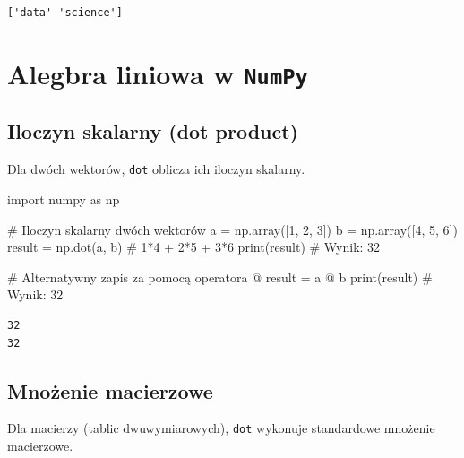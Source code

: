 \documentclass[
  letterpaper,
  DIV=11,
  numbers=noendperiod]{scrreprt}
\newenvironment{Shaded}{\begin{snugshade}}{\end{snugshade}}
\newcommand{\BuiltInTok}[1]{\textcolor[rgb]{0.00,0.23,0.31}{#1}}
\newcommand{\CommentTok}[1]{\textcolor[rgb]{0.37,0.37,0.37}{#1}}
\newcommand{\DecValTok}[1]{\textcolor[rgb]{0.68,0.00,0.00}{#1}}
\newcommand{\ImportTok}[1]{\textcolor[rgb]{0.00,0.46,0.62}{#1}}
\newcommand{\NormalTok}[1]{\textcolor[rgb]{0.00,0.23,0.31}{#1}}
\newcommand{\OperatorTok}[1]{\textcolor[rgb]{0.37,0.37,0.37}{#1}}
\begin{document}
\begin{verbatim}
['data' 'science']
\end{verbatim}

\chapter{\texorpdfstring{Alegbra liniowa w
\texttt{NumPy}}{Alegbra liniowa w NumPy}}\label{alegbra-liniowa-w-numpy}

\section{Iloczyn skalarny (dot
product)}\label{iloczyn-skalarny-dot-product}

Dla dwóch wektorów, \texttt{dot} oblicza ich iloczyn skalarny.

\begin{Shaded}
\begin{Highlighting}[]
\ImportTok{import}\NormalTok{ numpy }\ImportTok{as}\NormalTok{ np}

\CommentTok{\# Iloczyn skalarny dwóch wektorów}
\NormalTok{a }\OperatorTok{=}\NormalTok{ np.array([}\DecValTok{1}\NormalTok{, }\DecValTok{2}\NormalTok{, }\DecValTok{3}\NormalTok{])}
\NormalTok{b }\OperatorTok{=}\NormalTok{ np.array([}\DecValTok{4}\NormalTok{, }\DecValTok{5}\NormalTok{, }\DecValTok{6}\NormalTok{])}
\NormalTok{result }\OperatorTok{=}\NormalTok{ np.dot(a, b)  }\CommentTok{\# 1*4 + 2*5 + 3*6}
\BuiltInTok{print}\NormalTok{(result)  }\CommentTok{\# Wynik: 32}

\CommentTok{\# Alternatywny zapis za pomocą operatora @}
\NormalTok{result }\OperatorTok{=}\NormalTok{ a }\OperatorTok{@}\NormalTok{ b}
\BuiltInTok{print}\NormalTok{(result)  }\CommentTok{\# Wynik: 32}
\end{Highlighting}
\end{Shaded}

\begin{verbatim}
32
32
\end{verbatim}

\section{Mnożenie macierzowe}\label{mnoux17cenie-macierzowe}

Dla macierzy (tablic dwuwymiarowych), \texttt{dot} wykonuje standardowe
mnożenie macierzowe.
\end{document}
